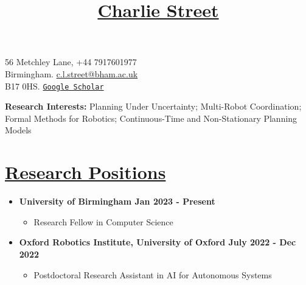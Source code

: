 \documentclass[11pt]{article}
\title{\vspace{-70pt}\Huge\underline{Charlie Street}}
\date{}
\begin{document}
\maketitle
\vspace*{-60pt}

\begin{flushleft}
\noindent
\large 56 Metchley Lane,
\hfill 
\large +44 7917601977 \\
\large Birmingham. 
\hfill
\large
\large \href{mailto:c.l.street@bham.ac.uk}{\url{c.l.street@bham.ac.uk}} \\
\large B17 0HS.
\hfill
\large
\href{https://scholar.google.com/citations?user=Qyzuo6IAAAAJ&hl=en}{\texttt{Google Scholar}} \\
\end{flushleft}
	
\noindent \textbf{Research Interests:} Planning Under Uncertainty; Multi-Robot Coordination;  Formal Methods for Robotics; Continuous-Time and Non-Stationary Planning Models

\vspace{-10pt}
\section*{\uline{Research Positions\hfill}}
\vspace{-5pt}
\begin{itemize}
\item \textbf{University of Birmingham \hfill Jan 2023 - Present} 
\begin{itemize}
    \item Research Fellow in Computer Science
\end{itemize}
\item \textbf{Oxford Robotics Institute, University of Oxford \hfill July 2022 - Dec 2022} 
\begin{itemize}
    \item Postdoctoral Research Assistant in AI for Autonomous Systems
\end{itemize}
\end{itemize}

\vspace{-10pt}
\end{document}
